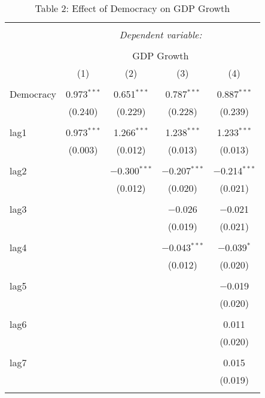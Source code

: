 
\begin{table}[!htbp] \centering 
  \caption{Table 2: Effect of Democracy on GDP Growth} 
  \label{} 
\begin{tabular}{@{\extracolsep{5pt}}lcccc} 
\\[-1.8ex]\hline 
\hline \\[-1.8ex] 
 & \multicolumn{4}{c}{\textit{Dependent variable:}} \\ 
\cline{2-5} 
\\[-1.8ex] & \multicolumn{4}{c}{GDP Growth} \\ 
 & (1) & (2) & (3) & (4) \\ 
\hline \\[-1.8ex] 
 Democracy & 0.973$^{***}$ & 0.651$^{***}$ & 0.787$^{***}$ & 0.887$^{***}$ \\ 
  & (0.240) & (0.229) & (0.228) & (0.239) \\ 
  & & & & \\ 
 lag1 & 0.973$^{***}$ & 1.266$^{***}$ & 1.238$^{***}$ & 1.233$^{***}$ \\ 
  & (0.003) & (0.012) & (0.013) & (0.013) \\ 
  & & & & \\ 
 lag2 &  & $-$0.300$^{***}$ & $-$0.207$^{***}$ & $-$0.214$^{***}$ \\ 
  &  & (0.012) & (0.020) & (0.021) \\ 
  & & & & \\ 
 lag3 &  &  & $-$0.026 & $-$0.021 \\ 
  &  &  & (0.019) & (0.021) \\ 
  & & & & \\ 
 lag4 &  &  & $-$0.043$^{***}$ & $-$0.039$^{*}$ \\ 
  &  &  & (0.012) & (0.020) \\ 
  & & & & \\ 
 lag5 &  &  &  & $-$0.019 \\ 
  &  &  &  & (0.020) \\ 
  & & & & \\ 
 lag6 &  &  &  & 0.011 \\ 
  &  &  &  & (0.020) \\ 
  & & & & \\ 
 lag7 &  &  &  & 0.015 \\ 
  &  &  &  & (0.019) \\ 
  & & & & \\ 

\end{tabular}
\end{table}
